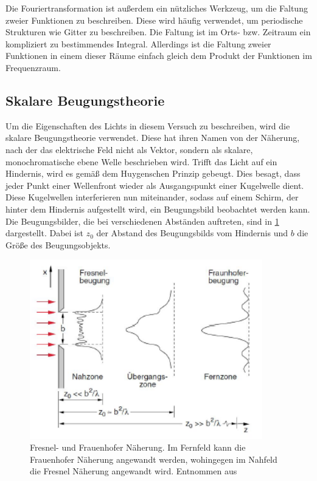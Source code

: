 Die Fouriertransformation ist außerdem ein nützliches Werkzeug, um die Faltung zweier Funktionen zu beschreiben. Diese wird häufig verwendet, um periodische Strukturen wie Gitter zu beschreiben. Die Faltung ist im Orts- bzw. Zeitraum ein kompliziert zu bestimmendes Integral. Allerdings ist die Faltung zweier Funktionen in einem dieser Räume einfach gleich dem Produkt der Funktionen im Frequenzraum.

\subsection{Skalare Beugungstheorie}
Um die Eigenschaften des Lichts in diesem Versuch zu beschreiben, wird die skalare Beugungstheorie verwendet. Diese hat ihren Namen von der Näherung, nach der das elektrische Feld nicht als Vektor, sondern als skalare, monochromatische ebene Welle beschrieben wird. Trifft das Licht auf ein Hindernis, wird es gemäß dem Huygenschen Prinzip gebeugt. Dies besagt, dass jeder Punkt einer Wellenfront wieder als Ausgangspunkt einer Kugelwelle dient. Diese Kugelwellen interferieren nun miteinander, sodass auf einem Schirm, der hinter dem Hindernis aufgestellt wird, ein Beugungsbild beobachtet werden kann. Die Beugungsbilder, die bei verschiedenen Abständen auftreten, sind in \cref{Theoriebild} dargestellt. Dabei ist $z_0$ der Abstand des Beugungsbilds vom Hindernis und $b$ die Größe des Beugungsobjekts.

\begin{figure}[h!]
	\centering
	\includegraphics[width=0.9\textwidth]{abstande.png}
	\caption{Fresnel- und Frauenhofer Näherung. Im Fernfeld kann die Frauenhofer Näherung angewandt werden, wohingegen im Nahfeld die Fresnel Näherung angewandt wird. Entnommen aus \cite[5]{anleitung-ws2014}}
	\label{Theoriebild}
\end{figure}

